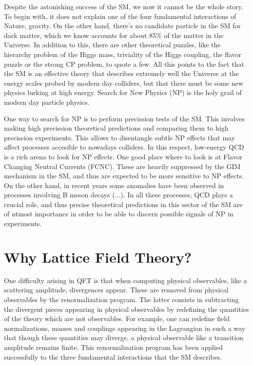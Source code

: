 Despite the astonishing success of the SM, we now it cannot be the whole story. To begin with, it does not explain one of the four fundamental interactions of Nature, gravity. On the other hand, there's no candidate particle in the SM for dark matter, which we know accounts for about 85\% of the matter in the Universe. In addition to this, there are other theoretical puzzles, like the hierarchy problem of the Higgs mass, triviality of the Higgs coupling, the flavor puzzle or the strong CP problem, to quote a few. All this points to the fact that the SM is an effective theory that describes extremely well the Universe at the energy scales probed by modern day colliders, but that there must be some new physics lurking at high energy. Search for New Physics (NP) is the holy grail of modern day particle physics. 

One way to search for NP is to perform precission tests of the SM. This involves making high precission theoretical predictions and comparing them to high precission experiments. This allows to disentangle subtle NP effects that may affect processes accesible to nowadays colliders. In this respect, low-energy QCD is a rich arena to look for NP effects. One good place where to look is at Flavor Changing Neutral Currents (FCNC). These are heavily suppressed by the GIM mechanism in the SM, and thus are expected to be more sensitive to NP effects. On the other hand, in recent years some anomalies have been observed in processes involving B meson decays (...). In all these processes, QCD plays a crucial role, and thus precise theoretical predictions in this sector of the SM are of utmost importance in order to be able to discern possible signals of NP in experiments. 

\section{Why Lattice Field Theory?}

One difficulty arising in QFT is that when computing physical observables, like a scattering amplitude, divergences appear. These are removed from physical observables by the renormalization program. The latter consists in subtracting the divergent pieces appearing in physical observables by redefining the quantities of the theory which are not observables. For example, one can redefine field normalizations, masses and couplings appearing in the Lagrangian in such a way that though these quantities may diverge, a physical observable like a transition amplitude remains finite. This renormalization program has been applied successfully to the three fundamental interactions that the SM describes.

